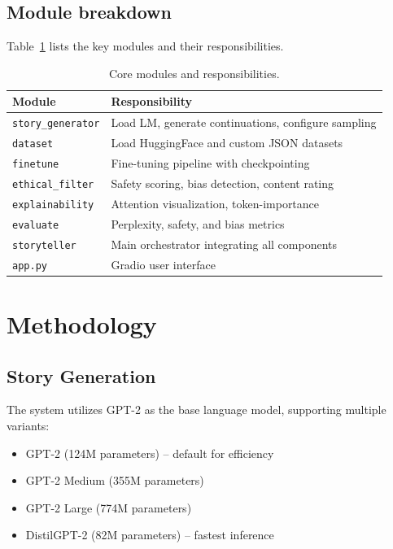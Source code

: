 \documentclass[conference]{IEEEtran}
\begin{document}
\subsection{Module breakdown}
Table~\ref{tab:modules} lists the key modules and their responsibilities.

\begin{table}[t]
    \centering
    \caption{Core modules and responsibilities.}
    \label{tab:modules}
    \begin{tabular}{lp{5.2cm}}
        \toprule
        Module & Responsibility \\
        \midrule
        \texttt{story\_generator} & Load LM, generate continuations, configure sampling \\
        \texttt{dataset} & Load HuggingFace and custom JSON datasets \\
        \texttt{finetune} & Fine-tuning pipeline with checkpointing \\
        \texttt{ethical\_filter} & Safety scoring, bias detection, content rating \\
        \texttt{explainability} & Attention visualization, token-importance \\
        \texttt{evaluate} & Perplexity, safety, and bias metrics \\
        \texttt{storyteller} & Main orchestrator integrating all components \\
        \texttt{app.py} & Gradio user interface \\
        \bottomrule
    \end{tabular}
\end{table}

\section{Methodology}
\subsection{Story Generation}
The system utilizes GPT-2 as the base language model, supporting multiple variants:
\begin{itemize}
    \item GPT-2 (124M parameters) -- default for efficiency
    \item GPT-2 Medium (355M parameters)
    \item GPT-2 Large (774M parameters)
    \item DistilGPT-2 (82M parameters) -- fastest inference
\end{itemize}
\end{document}
